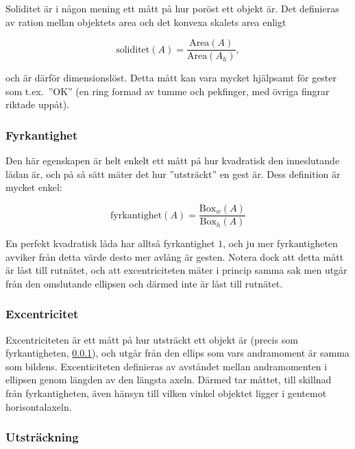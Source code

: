 \documentclass[../rapport_MVEX01-11-05]{subfiles}
\begin{document}
Soliditet är i någon mening ett mått på hur poröst ett objekt är. Det
definieras av ration mellan objektets area och det konvexa skalets
area enligt

\begin{equation*}
  \textrm{soliditet}(A) = \frac{\textrm{Area}(A)}{\textrm{Area}(A_h)},
\end{equation*}

och är därför dimensionslöst. Detta mått kan vara mycket hjälpsamt för
gester som t.ex.~''OK'' (en ring formad av tumme och pekfinger, med
övriga fingrar riktade uppåt).

\subsubsection{Fyrkantighet}
\label{feat:fyrkantighet}

Den här egenskapen är helt enkelt ett mått på hur kvadratisk den
inneslutande lådan är, och på så sätt mäter det hur ''utsträckt'' en
gest är. Dess definition är mycket enkel:

\begin{equation*}
  \textrm{fyrkantighet}(A) = \frac{\textrm{Box}_w(A)}{\textrm{Box}_h(A)}
\end{equation*}

En perfekt kvadratisk låda har alltså fyrkantighet $1$, och ju mer
fyrkantigheten avviker från detta värde desto mer avlång är gesten.
Notera dock att detta mått är låst till rutnätet, och att
excentriciteten mäter i princip samma sak men utgår från den
omslutande ellipsen och därmed inte är låst till rutnätet.

\subsubsection{Excentricitet}

Excentriciteten är ett mått på hur utsträckt ett objekt är (precis som
fyrkantigheten, \ref{feat:fyrkantighet}), och utgår från den ellips som
vars andramoment är samma som bildens. Excenticiteten definieras av avståndet
mellan andramomenten i ellipsen genom längden av den längsta axeln. Därmed
tar måttet, till skillnad från fyrkantigheten, även hänsyn till vilken vinkel
objektet ligger i gentemot horisontalaxeln.

\subsubsection{Utsträckning}
\end{document}
